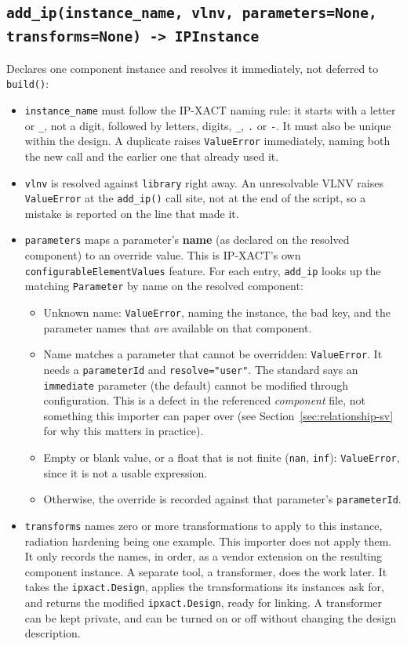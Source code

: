 \documentclass[11pt]{article}
\newcommand{\code}[1]{\texttt{#1}}
\begin{document}
\subsection{\texttt{add\_ip(instance\_name, vlnv, parameters=None, transforms=None) -> IPInstance}}

Declares one component instance and resolves it immediately, not deferred to
\code{build()}:

\begin{itemize}
    \item \code{instance\_name} must follow the IP-XACT naming rule: it starts with a letter
    or \code{\_}, not a digit, followed by letters, digits, \code{\_}, \code{.} or
    \code{-}. It must also be unique within the design. A duplicate raises
    \code{ValueError} immediately, naming both the new call and the earlier one that
    already used it.
    \item \code{vlnv} is resolved against \code{library} right away. An unresolvable VLNV
    raises \code{ValueError} at the \code{add\_ip()} call site, not at the end of the
    script, so a mistake is reported on the line that made it.
    \item \code{parameters} maps a parameter's \textbf{name} (as declared on the resolved
    component) to an override value. This is IP-XACT's own \code{configurableElementValues}
    feature. For each entry, \code{add\_ip} looks up the matching \code{Parameter} by name
    on the resolved component:
    \begin{itemize}
        \item Unknown name: \code{ValueError}, naming the instance, the bad key, and the
        parameter names that \emph{are} available on that component.
        \item Name matches a parameter that cannot be overridden: \code{ValueError}. It
        needs a \code{parameterId} and \code{resolve="user"}. The standard says an
        \code{immediate} parameter (the default) cannot be modified through configuration.
        This is a defect in the referenced \emph{component} file, not something this importer
        can paper over (see Section~\ref{sec:relationship-sv} for why this matters in
        practice).
        \item Empty or blank value, or a float that is not finite (\code{nan}, \code{inf}):
        \code{ValueError}, since it is not a usable expression.
        \item Otherwise, the override is recorded against that parameter's
        \code{parameterId}.
    \end{itemize}
    \item \code{transforms} names zero or more transformations to apply to this
    instance, radiation hardening being one example. This importer does not apply them.
    It only records the names, in order, as a vendor extension on the resulting component
    instance.
    A separate tool, a transformer, does the work later. It takes the
    \code{ipxact.Design}, applies the transformations its instances ask for, and returns
    the modified \code{ipxact.Design}, ready for linking. A transformer can be kept
    private, and can be turned on or off without changing the design description.
\end{itemize}
\end{document}
